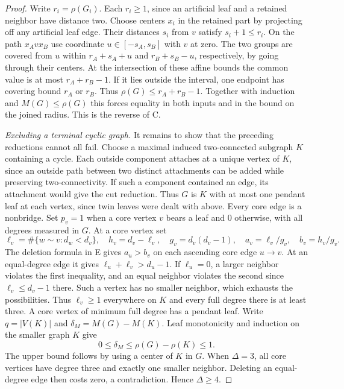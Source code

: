 \documentclass[11pt,a4paper]{article}
\begin{document}
\begin{proof}
Write $r_i=\rho(G_i)$. Each $r_i\ge1$, since an artificial leaf and a
retained neighbor have distance two. Choose centers $x_i$ in the retained
part by projecting off any artificial leaf edge. Their distances $s_i$
from $v$ satisfy $s_i+1\le r_i$. On the path $x_A v x_B$ use coordinate
$u\in[-s_A,s_B]$ with $v$ at zero. The two groups are covered from $u$
within $r_A+s_A+u$ and $r_B+s_B-u$, respectively, by going through
their centers. At the intersection of these affine bounds the common
value is at most $r_A+r_B-1$. If it lies outside the interval, one
endpoint has covering bound $r_A$ or $r_B$. Thus
$\rho(G)\le r_A+r_B-1$. Together with induction and $M(G)\le\rho(G)$
this forces equality in both inputs and in the bound on the joined
radius. This is the reverse of C.

\emph{Excluding a terminal cyclic graph.} It remains to show that the
preceding reductions cannot all fail. Choose a maximal induced
two-connected subgraph $K$ containing a cycle. Each outside component
attaches at a unique vertex of $K$, since an outside path between two
distinct attachments can be added while preserving two-connectivity.
If such a component contained an edge, its attachment would give the
cut reduction. Thus $G$ is $K$ with at most one pendant leaf at each
vertex, since twin leaves were dealt with above. Every core edge is a
nonbridge. Set $p_v=1$ when a core vertex $v$ bears a leaf and $0$
otherwise, with all degrees measured in $G$. At a core vertex set
\[
 \ell_v=\#\{w\sim v:d_w<d_v\},\quad h_v=d_v-\ell_v,\quad
 g_v=d_v(d_v-1),\quad a_v=\ell_v/g_v,\quad b_v=h_v/g_v .
\]
The deletion formula in E gives $a_u>b_v$ on each ascending core edge
$u\to v$. At an equal-degree edge it gives $\ell_u+\ell_v>d_u-1$.
If $\ell_u=0$, a larger neighbor violates the first inequality, and an
equal neighbor violates the second since $\ell_v\le d_v-1$ there.
Such a vertex has no smaller neighbor, which exhausts the possibilities.
Thus $\ell_v\ge1$ everywhere on $K$ and every full degree there is at
least three. A core vertex of minimum full degree has a pendant leaf.
Write $q=|V(K)|$ and $\delta_M=M(G)-M(K)$. Leaf monotonicity and induction
on the smaller graph $K$ give
\[
 0\le\delta_M\le\rho(G)-\rho(K)\le1 .
\]
The upper bound follows by using a center of $K$ in $G$. When
$\Delta=3$, all core vertices have degree three and exactly one smaller
neighbor. Deleting an equal-degree edge then costs zero, a contradiction.
Hence $\Delta\ge4$.


\end{proof}
\end{document}
